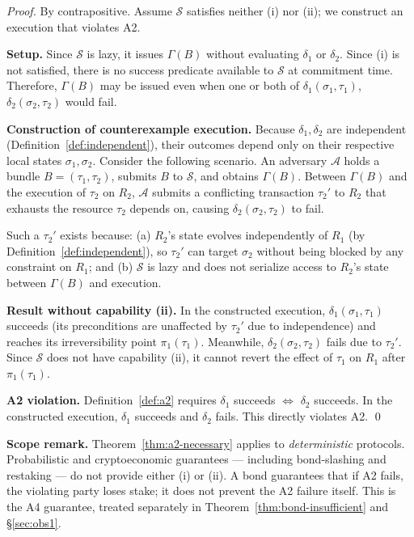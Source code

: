 \begin{proof}
By contrapositive. Assume $\mathcal{S}$ satisfies neither (i) nor (ii); we
construct an execution that violates A2.

\medskip
\noindent\textbf{Setup.} Since $\mathcal{S}$ is lazy, it issues $\Gamma(B)$
without evaluating $\delta_1$ or $\delta_2$. Since (i) is not satisfied, there
is no success predicate available to $\mathcal{S}$ at commitment time. Therefore,
$\Gamma(B)$ may be issued even when one or both of $\delta_1(\sigma_1, \tau_1)$,
$\delta_2(\sigma_2, \tau_2)$ would fail.

\medskip
\noindent\textbf{Construction of counterexample execution.} Because $\delta_1,
\delta_2$ are independent (Definition~\ref{def:independent}), their outcomes
depend only on their respective local states $\sigma_1, \sigma_2$. Consider
the following scenario. An adversary $\mathcal{A}$ holds a bundle
$B = (\tau_1, \tau_2)$, submits $B$ to $\mathcal{S}$, and obtains $\Gamma(B)$.
Between $\Gamma(B)$ and the execution of $\tau_2$ on $R_2$, $\mathcal{A}$
submits a conflicting transaction $\tau_2'$ to $R_2$ that exhausts the resource
$\tau_2$ depends on, causing $\delta_2(\sigma_2, \tau_2)$ to fail.

Such a $\tau_2'$ exists because: (a) $R_2$'s state evolves independently of
$R_1$ (by Definition~\ref{def:independent}), so $\tau_2'$ can target $\sigma_2$
without being blocked by any constraint on $R_1$; and (b) $\mathcal{S}$ is lazy
and does not serialize access to $R_2$'s state between $\Gamma(B)$ and execution.

\medskip
\noindent\textbf{Result without capability (ii).} In the constructed execution,
$\delta_1(\sigma_1, \tau_1)$ succeeds (its preconditions are unaffected by
$\tau_2'$ due to independence) and reaches its irreversibility point
$\pi_1(\tau_1)$. Meanwhile, $\delta_2(\sigma_2, \tau_2)$ fails due to
$\tau_2'$. Since $\mathcal{S}$ does not have capability (ii), it cannot revert
the effect of $\tau_1$ on $R_1$ after $\pi_1(\tau_1)$.

\medskip
\noindent\textbf{A2 violation.} Definition~\ref{def:a2} requires
$\delta_1$ succeeds $\iff$ $\delta_2$ succeeds. In the constructed execution,
$\delta_1$ succeeds and $\delta_2$ fails. This directly violates A2. \qed
\end{proof}

\noindent\textbf{Scope remark.} Theorem~\ref{thm:a2-necessary} applies to
\emph{deterministic} protocols. Probabilistic and cryptoeconomic guarantees ---
including bond-slashing and restaking --- do not provide either (i) or (ii).
A bond guarantees that if A2 fails, the violating party loses stake; it does not
prevent the A2 failure itself. This is the A4 guarantee, treated separately in
Theorem~\ref{thm:bond-insufficient} and \S\ref{sec:obs1}.

